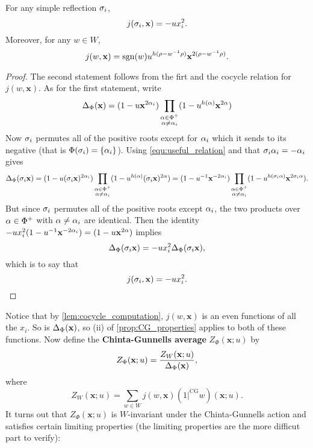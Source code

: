 \documentclass[12pt,reqno,oneside]{amsart}
\begin{document}
        \begin{lemma}\label{lem:cocycle_computation}
            For any simple reflection $\sigma_{i}$,
            \[
                j(\sigma_{i},\mathbf{x}) = -ux_{i}^{2}.
            \]
            Moreover, for any $w \in W$,
            \[
                j(w,\mathbf{x}) = \operatorname{\mathrm{sgn}}(w)u^{h(\rho-w^{-1}\rho)}\mathbf{x}^{2(\rho-w^{-1}\rho)}.
            \]
        \end{lemma}
        \begin{proof}
            The second statement follows from the firt and the cocycle relation for $j(w,\mathbf{x})$. As for the first statement, write
            \[
                \Delta_{\Phi}(\mathbf{x}) = (1-u\mathbf{x}^{2\alpha_{i}})\prod_{\substack{\alpha \in \Phi^{+} \\ \alpha \neq \alpha_{i}}}(1-u^{h(\alpha)}\mathbf{x}^{2\alpha})
            \]
            Now $\sigma_{i}$ permutes all of the positive roots except for $\alpha_{i}$ which it sends to its negative (that is $\Phi(\sigma_{i}) = \{\alpha_{i}\}$). Using \cref{equ:useful_relation} and that $\sigma_{i}\alpha_{i} = -\alpha_{i}$ gives
            \[
                \Delta_{\Phi}(\sigma_{i}\mathbf{x}) = (1-u(\sigma_{i}\mathbf{x})^{2\alpha_{i}})\prod_{\substack{\alpha \in \Phi^{+} \\ \alpha \neq \alpha_{i}}}(1-u^{h(\alpha)}(\sigma_{i}\mathbf{x})^{2\alpha}) = (1-u^{-1}\mathbf{x}^{-2\alpha_{i}})\prod_{\substack{\alpha \in \Phi^{+} \\ \alpha \neq \alpha_{i}}}(1-u^{h(\sigma_{i}\alpha)}\mathbf{x}^{2\sigma_{i}\alpha}).
            \]
            But since $\sigma_{i}$ permutes all of the positive roots except $\alpha_{i}$, the two products over $\alpha \in \Phi^{+}$ with $\alpha \neq \alpha_{i}$ are identical. Then the identity $-ux_{i}^{2}(1-u^{-1}\mathbf{x}^{-2\alpha_{i}}) = (1-u\mathbf{x}^{2\alpha})$ implies 
            \[
                \Delta_{\Phi}(\sigma_{i}\mathbf{x}) = -ux_{i}^{2}\Delta_{\Phi}(\sigma_{i}\mathbf{x}),
            \]
            which is to say that
            \[
                j(\sigma_{i},\mathbf{x}) = -ux_{i}^{2}.
            \]
        \end{proof}

        Notice that by \cref{lem:cocycle_computation}, $j(w,\mathbf{x})$ is an even functions of all the $x_{i}$. So is $\Delta_{\Phi}(\mathbf{x})$, so (ii) of \cref{prop:CG_properties} applies to both of these functions. Now define the \textbf{Chinta-Gunnells average} $Z_{\Phi}(\mathbf{x};u)$ by
        \[
            Z_{\Phi}(\mathbf{x};u) = \frac{Z_{W}(\mathbf{x};u)}{\Delta_{\Phi}(\mathbf{x})},
        \]
        where
        \[
            Z_{W}(\mathbf{x};u) = \sum_{w \in W}j(w,\mathbf{x})(1|^{\mathrm{CG}}w)(\mathbf{x};u).
        \]
        It turns out that $Z_{\Phi}(\mathbf{x};u)$ is $W$-invariant under the Chinta-Gunnells action and satisfies certain limiting properties (the limiting properties are the more difficut part to verify):
\end{document}
